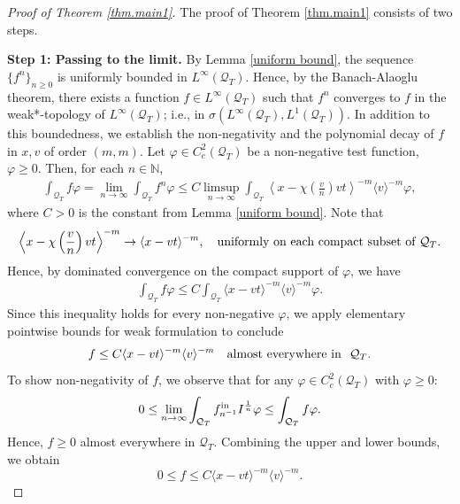 \documentclass[reqno,11pt,final]{amsart}
\theoremstyle{plain}
\numberwithin{equation}{section}
\numberwithin{theorem}{section}
\begin{document}
\begin{proof}[Proof of Theorem \ref{thm.main1}] The proof of Theorem \ref{thm.main1} consists of two steps. 

\textbf{Step 1: Passing to the limit. }By Lemma \ref{uniform bound}, the sequence $\{f^n\}_{n\ge0}$ is uniformly bounded in $L^\infty(\mathcal{Q}_T)$. Hence, by the Banach-Alaoglu theorem, there exists a function $f\in L^\infty(\mathcal{Q}_T)$ such that $f^n$ converges to $f$ in the weak*-topology of $L^\infty(\mathcal{Q}_T)$; i.e., in $\sigma(L^\infty(\mathcal{Q}_T), L^1(\mathcal{Q}_T))$. In addition to this boundedness, we establish the non-negativity and the polynomial decay of $f$ in $x,v$ of order $(m,m)$. Let $\varphi\in C_c^2(\mathcal{Q}_T)$ be a non-negative test function, $\varphi\ge0$. Then, for each $n\in\mathbb{N}$,
\begin{align*}
\int_{\mathcal{Q}_T} f\varphi = \lim_{n\to\infty}\int_{\mathcal{Q}_T} f^n\varphi\le C\limsup_{n\to\infty} \int_{\mathcal{Q}_T}\left\langle x-\chi\left(\frac{v}{n}\right)vt\right\rangle^{-m}\langle v\rangle^{-m} \varphi,
\end{align*}where $C>0$ is the constant from Lemma \ref{uniform bound}. Note that
\begin{align*}
\left\langle x-\chi\left(\frac{v}{n}\right)vt\right\rangle^{-m}\to \langle x-vt\rangle^{-m}, \quad\textup{uniformly on each compact subset of $\mathcal{Q}_T$.}
\end{align*}Hence, by dominated convergence on the compact support of $\varphi$, we have
\begin{align*}
\int_{\mathcal{Q}_T} f\varphi \le C\int_{\mathcal{Q}_T} \langle x - vt\rangle^{-m}\langle v\rangle^{-m}\varphi.
\end{align*}Since this inequality holds for every non-negative $\varphi$, we apply elementary pointwise bounds for weak formulation   \cite[Exercise 4.26]{FA_Brezis_2011} to conclude
\begin{align*}
f\le C\langle x-vt\rangle^{-m}\langle v\rangle^{-m} \quad \textup{almost everywhere in }\,\,\mathcal{Q}_T.
\end{align*}To show non-negativity of $f$, we observe that for any $\varphi\in C_c^2(\mathcal{Q}_T)$ with $\varphi\ge0$:
\begin{align*}
0\le \lim_{n\to\infty}\int_{\mathcal{Q}_T} f^\textup{in}_{n^{-1}}I^{\frac{1}{n}}\varphi \le \int_{\mathcal{Q}_T}f\varphi.
\end{align*} Hence, $f\ge0$ almost everywhere in $\mathcal{Q}_T$. Combining the upper and lower bounds, we obtain $$0\le f\le C \langle x-vt\rangle^{-m}\langle v\rangle^{-m}.$$


\end{proof}
\end{document}
